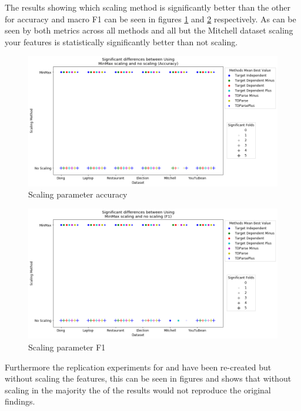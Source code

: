 The results showing which scaling method is significantly better than the other for accuracy and macro F1 can be seen in figures \ref{fig:repro_param_scale_sig_acc} and \ref{fig:repro_param_scale_sig_f1} respectively. As can be seen by both metrics across all methods and all but the Mitchell dataset scaling your features is statistically significantly better than not scaling.
\begin{figure}[!htb]
    \centering
    \includegraphics[scale=0.4]{images/reproducibility/Parameters/Scaling/Scaling_Sig_Plot_Accuracy.png}
    \caption{Scaling parameter accuracy}
    \label{fig:repro_param_scale_sig_acc}
\end{figure}
\begin{figure}[!htb]
    \centering
    \includegraphics[scale=0.4]{images/reproducibility/Parameters/Scaling/Scaling_Sig_Plot_F1.png}
    \caption{Scaling parameter F1}
    \label{fig:repro_param_scale_sig_f1}
\end{figure}
Furthermore the replication experiments for \citet{repro_vo_2015} and \citet{repro_wang_2017} have been re-created but without scaling the features, this can be seen in figures and shows that without scaling in the majority the of the results would not reproduce the original findings.
